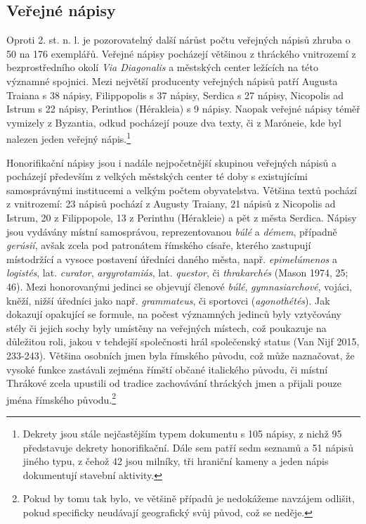 \subsection[veřejné-nápisy-15]{Veřejné nápisy}

Oproti 2. st. n. l. je pozorovatelný další nárůst počtu veřejných nápisů zhruba o 50  na 176 exemplářů. Veřejné nápisy pocházejí většinou z thráckého vnitrozemí z bezprostředního okolí {\em Via Diagonalis} a městských center ležících na této významné spojnici. Mezi největší producenty veřejných nápisů patří Augusta Traiana s 38 nápisy, Filippopolis s 37 nápisy, Serdica s 27 nápisy, Nicopolis ad Istrum s 22 nápisy, Perinthos (Hérakleia) s 9 nápisy. Naopak veřejné nápisy téměř vymizely z Byzantia, odkud pocházejí pouze dva texty, či z Maróneie, kde byl nalezen jeden veřejný nápis.\footnote{Dekrety jsou stále nejčastějším typem dokumentu s 105 nápisy, z nichž 95 představuje dekrety honorifikační. Dále sem patří sedm seznamů a 51 nápisů jiného typu, z čehož 42 jsou milníky, tři hraniční kameny a jeden nápis dokumentují stavební aktivity.}

Honorifikační nápisy jsou i nadále nejpočetnější skupinou veřejných nápisů a pocházejí především z velkých městských center té doby s existujícími samosprávnými institucemi a velkým počtem obyvatelstva. Většina textů pochází z vnitrozemí: 23 nápisů pochází z Augusty Traiany, 21 nápisů z Nicopolis ad Istrum, 20 z Filippopole, 13 z Perinthu (Hérakleie) a pět z města Serdica. Nápisy jsou vydávány místní samosprávou, reprezentovanou {\em búlé} a {\em démem}, případně {\em gerúsií}, avšak zcela pod patronátem římského císaře, kterého zastupují místodržící a vysoce postavení úředníci daného města, např. {\em epimelúmenos} a {\em logistés}, lat. {\em curator}, {\em argyrotamiás}, lat. {\em questor}, či {\em thrakarchés} (Mason 1974, 25; 46). Mezi honorovanými jedinci se objevují členové {\em búlé}, {\em gymnasiarchové}, vojáci, kněží, nižší úředníci jako např. {\em grammateus}, či sportovci ({\em agonothétés}). Jak dokazují opakující se formule, na počest významných jedinců byly vztyčovány stély či jejich sochy byly umístěny na veřejných místech, což poukazuje na důležitou roli, jakou v tehdejší společnosti hrál společenský status (Van Nijf 2015, 233-243). Většina osobních jmen byla římského původu, což může naznačovat, že vysoké funkce zastávali zejména římští občané italického původu, či místní Thrákové zcela upustili od tradice zachovávání thráckých jmen a přijali pouze jména římského původu.\footnote{Pokud by tomu tak bylo, ve většině případů je nedokážeme navzájem odlišit, pokud specificky neudávají geografický svůj původ, což se neděje.}


